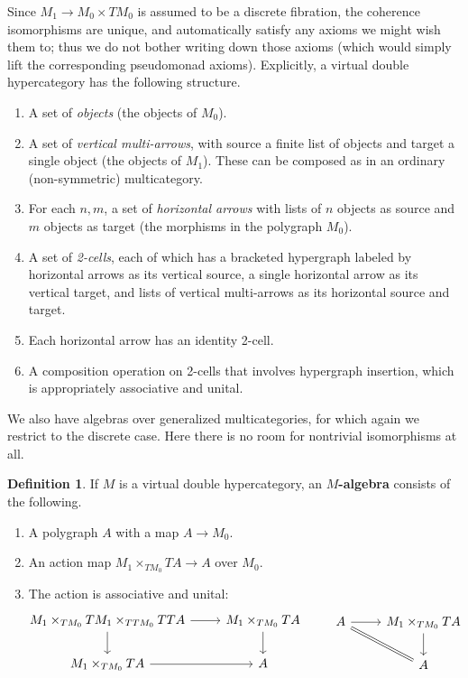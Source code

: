 \documentclass{article}
\theoremstyle{definition}
\newtheorem{defn}[thm]{Definition}
\theoremstyle{remark}
\begin{document}
Since $M_1 \to M_0\times TM_0$ is assumed to be a discrete fibration, the coherence isomorphisms are unique, and automatically satisfy any axioms we might wish them to; thus we do not bother writing down those axioms (which would simply lift the corresponding pseudomonad axioms).
Explicitly, a virtual double hypercategory has the following structure.

\begin{enumerate}
\item A set of \emph{objects} (the objects of $M_0$).
\item A set of \emph{vertical multi-arrows}, with source a finite list of objects and target a single object (the objects of $M_1$).
  These can be composed as in an ordinary (non-symmetric) multicategory.
\item For each $n,m$, a set of \emph{horizontal arrows} with lists of $n$ objects as source and $m$ objects as target (the morphisms in the polygraph $M_0$).
\item A set of \emph{2-cells}, each of which has a bracketed hypergraph labeled by horizontal arrows as its vertical source, a single horizontal arrow as its vertical target, and lists of vertical multi-arrows as its horizontal source and target.
\item Each horizontal arrow has an identity 2-cell.
\item A composition operation on 2-cells that involves hypergraph insertion, which is appropriately associative and unital.
\end{enumerate}

We also have algebras over generalized multicategories, for which again we restrict to the discrete case.
Here there is no room for nontrivial isomorphisms at all.

\begin{defn}
  If $M$ is a virtual double hypercategory, an \textbf{$M$-algebra} consists of the following.
  \begin{enumerate}
  \item A polygraph $A$ with a map $A \to M_0$.
  \item An action map $M_1 \times_{TM_0} TA \to A$ over $M_0$.
  \item The action is associative and unital:
    \[\hspace{-2cm}
    \begin{tikzcd}
      M_1 \times_{TM_0} TM_1 \times_{TTM_0} TTA \ar[r] \ar[d] &M_1 \times_{TM_0} TA \ar[d]\\
      M_1 \times_{TM_0} TA \ar[r] & A
    \end{tikzcd}
    \qquad
    \begin{tikzcd}
      A \ar[r] \ar[dr,equals] & M_1 \times_{TM_0} TA\ar[d] \\ & A
    \end{tikzcd}\hspace{-2cm}
    \]
  \end{enumerate}
\end{defn}
\end{document}
